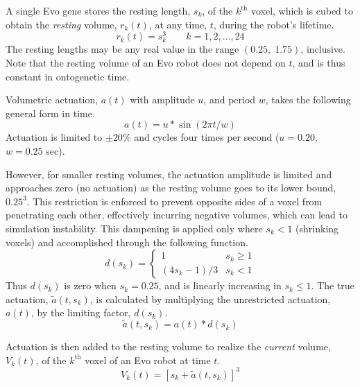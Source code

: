 A single Evo gene stores the resting length, $s_k$, of the $k^{\text{th}}$ voxel, which is cubed to obtain the \textit{resting} volume, $r_k(t)$, at any time, $t$, during the robot's lifetime.
\begin{equation} 
r_k(t)=s_k^3 \qquad k=1,2,\dots,24
\end{equation}
The resting lengths may be any real value in the range $(0.25,\; 1.75)$, inclusive. Note that the resting volume of an Evo robot does not depend on $t$, and is thus constant in ontogenetic time.

Volumetric actuation, $a(t)$ with amplitude $u$, and period $w$, takes the following general form in time.
\begin{equation}
a(t) = u* \sin(2\pi t/w)
\end{equation}
Actuation is limited to $\pm 20\%$ and cycles four times per second ($u=0.20$, $w=0.25$ sec).

However, for smaller resting volumes, the actuation amplitude is limited and approaches zero (no actuation) as the resting volume goes to its lower bound, $0.25^3$. This restriction is enforced to prevent opposite sides of a voxel from penetrating each other, effectively incurring negative volumes, which can lead to simulation instability. 
This dampening is applied only where $s_k<1$ (shrinking voxels) and accomplished through the following function.
\begin{equation}
d(s_k) = \begin{cases} 
      1 & s_k \geq 1 \\
      (4s_k-1)/3 & s_k < 1
   \end{cases}
\end{equation}
Thus $d(s_k)$ is zero when $s_k=0.25$, and is linearly increasing in $s_k\le1$. 
The true actuation, $\tilde{a}(t, s_k)$, is calculated by multiplying the unrestricted actuation, $a(t)$, by the limiting factor, $d(s_k)$.
\begin{equation}
\tilde{a}(t,s_k)=a(t)*d(s_k)
\end{equation}

Actuation is then added to the resting volume to realize the \textit{current} volume, $V_k(t)$, of the $k^{\text{th}}$ voxel of an Evo robot at time $t$.
\begin{equation} \label{eq:evo_vol}
V_k(t)=[s_k+\tilde{a}(t,s_k)]^3
\end{equation}

